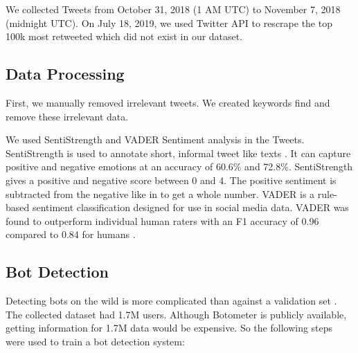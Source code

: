 \documentclass[letterpaper]{article}
\begin{document}
We collected Tweets from October 31, 2018 (1 AM UTC) to November 7, 2018 (midnight UTC). On July 18, 2019, we used Twitter API to rescrape the top 100k most retweeted which did not 
exist in our dataset.

\subsection{Data Processing}
First, we manually removed irrelevant tweets. We created keywords find and remove these irrelevant data.\par

We used SentiStrength and VADER Sentiment analysis in the Tweets. SentiStrength \cite{thelwall2010sentiment} is used to annotate short, informal tweet like texts \cite{bessi2016social}. 
It can capture positive and negative emotions at an accuracy of 60.6\% and 72.8\%. SentiStrength gives a positive and negative score between 0 and 4. The positive sentiment is subtracted 
from the negative like in \cite{bessi2016social} to get a whole number. VADER is a rule-based sentiment classification designed for use in social media data. VADER was found to outperform 
individual human raters with an F1 accuracy of 0.96 compared to 0.84 for humans \cite{hutto2014vader}.

\subsection{Bot Detection}
Detecting bots on the wild is more complicated than against a validation set \cite{bovet2019influence,varol2017early,ferrara2016rise}. The collected dataset had 1.7M 
users. Although Botometer is publicly available, getting information for 1.7M data would be expensive. So the following steps were used to train a bot detection system:
\end{document}
